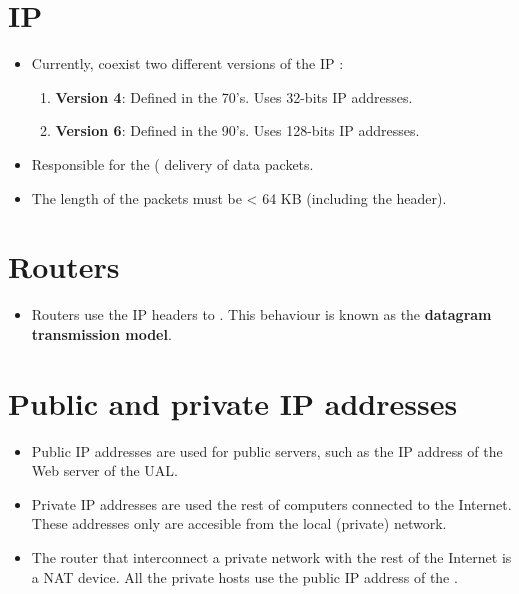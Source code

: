 \section{\gls{IP}}
\begin{itemize}
\item Currently, coexist two different versions of the IP
  \cite{wikipedia_IP}:
  \begin{enumerate}
  \item \textbf{Version 4}: Defined in the 70's. Uses 32-bits IP addresses.
  \item \textbf{Version 6}: Defined in the 90's. Uses 128-bits IP addresses.
  \end{enumerate}
\item Responsible for the ( delivery of data packets.
\item The length of the packets must be < 64 KB (including the header).
\end{itemize}

\section{Routers}
\begin{itemize} 
\item Routers use the IP headers to . This behaviour is known as the \textbf{datagram
    transmission model}.
\end{itemize}

\section{Public and private IP addresses}
\begin{itemize}
\item Public IP addresses are used for public servers, such as the IP
  address of the Web server of the UAL.
\item Private IP addresses are used the rest of computers connected to
  the Internet. These addresses only are accesible from the local
  (private) network.
\item The router that interconnect a private network with the rest of
  the Internet is a \gls{NAT} device. All the private hosts use the
  public IP address of the .
\end{itemize}

